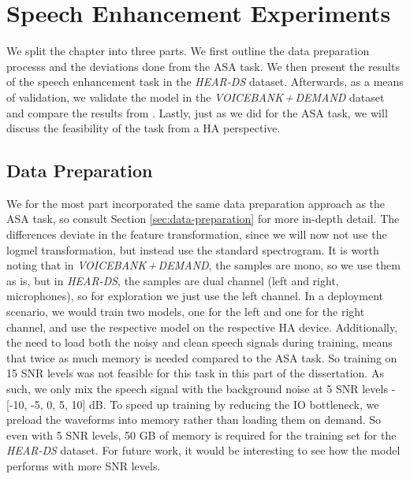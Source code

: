 \documentclass[logo,bsc,singlespacing,parskip,online]{infthesis}
\newcommand{\heards}{\textit{HEAR-DS}\xspace}
\newcommand{\vbd}{\textit{VOICEBANK\,+\,DEMAND}\xspace}
\begin{document}
\chapter{Speech Enhancement Experiments}
\label{chap:se-experiments}
We split the chapter into three parts. We first outline the data preparation processs 
and the deviations done from the ASA task. We then present the results of the speech 
enhancement task in the \heards dataset. Afterwards, as a means of validation, we 
validate the model in the \vbd dataset and compare the results from 
\citet{kim_specmix_2021}. Lastly, just as we did for the ASA task, we will 
discuss the feasibility of the task from a HA perspective.

\section{Data Preparation}
We for the most part incorporated the same data preparation approach as the ASA task, so consult Section \ref{sec:data-preparation} for 
more in-depth detail. The differences deviate in the feature transformation, 
since we will now not use the logmel transformation, but instead use the standard 
spectrogram. It is worth noting that in \vbd, the samples 
are mono, so we use them as is, but in \heards, the samples are dual channel (left and right, microphones), 
so for exploration we just use the left channel. In a deployment scenario, we would train two models, one for the left 
and one for the right channel, and use the respective model on the respective HA device.
Additionally, the need to load both the noisy and clean speech signals 
during training, means that twice as much memory is needed compared to the ASA task.
So training on 15 SNR levels was not feasible for this task 
in this part of the dissertation. As such, we only 
mix the speech signal with the background noise at 5 SNR levels - [-10, -5, 0, 5, 10] dB.
To speed up training by reducing the IO bottleneck, we preload the waveforms into memory 
rather than loading them on demand. So even with 5 SNR levels, 
50 GB of memory is required for the training set for the \heards dataset.
For future work, it would be interesting to see how the model performs with 
more SNR levels.
\end{document}
